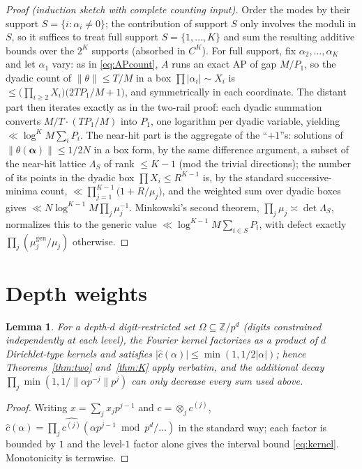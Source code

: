 \documentclass[11pt]{article}
\newtheorem{lemma}[theorem]{Lemma}
\newcommand{\nrm}[1]{\lVert #1\rVert}
\begin{document}
\begin{proof}[Proof (induction sketch with complete counting input)]
Order the modes by their support $S=\{i:\alpha_i\ne0\}$; the contribution of
support $S$ only involves the moduli in $S$, so it suffices to treat full
support $S=\{1,\dots,K\}$ and sum the resulting additive bounds over the
$2^K$ supports (absorbed in $C^K$).  For full support, fix
$\alpha_2,\dots,\alpha_K$ and let $\alpha_1$ vary: as in \eqref{eq:APcount},
$A$ runs an exact AP of gap $M/P_1$, so the dyadic count of
$\nrm\theta\le T/M$ in a box $\prod|\alpha_i|\sim X_i$ is
$\le\big(\prod_{i\ge2}X_i\big)\big(2T P_1/M+1\big)$, and symmetrically in each
coordinate.  The distant part then iterates exactly as in the two-rail proof:
each dyadic summation converts $M/T\cdot(TP_1/M)$ into $P_1$, one logarithm per
dyadic variable, yielding $\ll\log^KM\sum_iP_i$.  The near-hit part is the
aggregate of the ``$+1$''s: solutions of $\nrm{\theta(\boldsymbol\alpha)}\le1/2N$
in a box form, by the same difference argument, a subset of the near-hit
lattice $\Lambda_S$ of rank $\le K-1$ (mod the trivial directions); the number
of its points in the dyadic box $\prod X_i\le R^{K-1}$ is, by the standard
successive-minima count,
$\ll\prod_{j=1}^{K-1}\big(1+R/\mu_j\big)$,
and the weighted sum over dyadic boxes gives
$\ll N\log^{K-1}M\prod_j\mu_j^{-1}$.  Minkowski's second theorem,
$\prod_j\mu_j\asymp\det\Lambda_S$, normalizes this to the generic value
$\ll\log^{K-1}M\sum_{i\in S}P_i$, with defect exactly
$\prod_j(\mu_j^{\mathrm{gen}}/\mu_j)$ otherwise.
\end{proof}

\section{Depth weights}

\begin{lemma}
For a depth-$d$ digit-restricted set $\Omega\subseteq\mathbb Z/p^d$
(digits constrained independently at each level), the Fourier kernel
factorizes as a product of $d$ Dirichlet-type kernels and satisfies
$|\hat c(\alpha)|\le\min(1,1/2|\alpha|)$; hence Theorems~\ref{thm:two}
and~\ref{thm:K} apply verbatim, and the additional decay
$\prod_j\min(1,1/\nrm{\alpha p^{-j}}p^j)$ can only decrease every sum used
above.
\end{lemma}

\begin{proof}
Writing $x=\sum_jx_jp^{j-1}$ and $c=\otimes_jc^{(j)}$,
$\hat c(\alpha)=\prod_j\widehat{c^{(j)}}(\alpha p^{j-1}\bmod p^d/\ldots)$
in the standard way; each factor is bounded by $1$ and the level-$1$ factor
alone gives the interval bound \eqref{eq:kernel}.  Monotonicity is termwise.
\end{proof}
\end{document}

